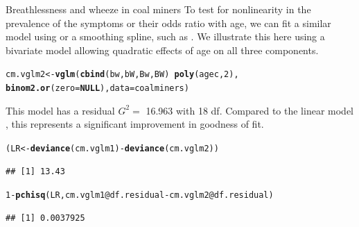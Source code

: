 \documentclass[11pt]{book}\usepackage[]{graphicx}\usepackage[]{color}
\makeatletter
\newcommand{\hlnum}[1]{\textcolor[rgb]{0.686,0.059,0.569}{#1}}%
\newcommand{\hlopt}[1]{\textcolor[rgb]{0,0,0}{#1}}%
\newcommand{\hlstd}[1]{\textcolor[rgb]{0.345,0.345,0.345}{#1}}%
\newcommand{\hlkwa}[1]{\textcolor[rgb]{0.161,0.373,0.58}{\textbf{#1}}}%
\newcommand{\hlkwb}[1]{\textcolor[rgb]{0.69,0.353,0.396}{#1}}%
\newcommand{\hlkwc}[1]{\textcolor[rgb]{0.333,0.667,0.333}{#1}}%
\newcommand{\hlkwd}[1]{\textcolor[rgb]{0.737,0.353,0.396}{\textbf{#1}}}%
\newenvironment{kframe}{%
 \def\at@end@of@kframe{}%
 \ifinner\ifhmode%
  \def\at@end@of@kframe{\end{minipage}}%
  \begin{minipage}{\columnwidth}%
 \fi\fi%
 \def\FrameCommand##1{\hskip\@totalleftmargin \hskip-\fboxsep
 \colorbox{shadecolor}{##1}\hskip-\fboxsep
     \hskip-\linewidth \hskip-\@totalleftmargin \hskip\columnwidth}%
 \MakeFramed {\advance\hsize-\width
   \@totalleftmargin\z@ \linewidth\hsize
   \@setminipage}}%
 {\par\unskip\endMakeFramed%
 \at@end@of@kframe}
\newenvironment{knitrout}{}{} %
\renewenvironment{knitrout}{\small\renewcommand{\baselinestretch}{.85}}{} %
\makeatother
\begin{document}
\begin{Example}[coalminers]{Breathlessness and wheeze in coal miners}
To test for nonlinearity in the prevalence of the symptoms or their odds ratio with
age, we can fit a similar model using  or a smoothing spline, such as
.  We illustrate this here using a bivariate model allowing quadratic
effects of age on all three components.

\begin{knitrout}
\color{fgcolor}\begin{kframe}
\begin{alltt}
\hlstd{cm.vglm2} \hlkwb{<-} \hlkwd{vglm}\hlstd{(}\hlkwd{cbind}\hlstd{(bw, bW, Bw, BW)} \hlopt{~} \hlkwd{poly}\hlstd{(agec,}\hlnum{2}\hlstd{),}
                 \hlkwd{binom2.or}\hlstd{(}\hlkwc{zero}\hlstd{=}\hlkwa{NULL}\hlstd{),} \hlkwc{data}\hlstd{=coalminers)}
\end{alltt}
\end{kframe}
\end{knitrout}

This model has a residual $G^2=$ 16.963 with 18
df.  Compared to the linear model , this represents a significant
improvement in goodness of fit.

\begin{knitrout}
\color{fgcolor}\begin{kframe}
\begin{alltt}
\hlstd{(LR} \hlkwb{<-} \hlkwd{deviance}\hlstd{(cm.vglm1)} \hlopt{-} \hlkwd{deviance}\hlstd{(cm.vglm2))}
\end{alltt}
\begin{verbatim}
## [1] 13.43
\end{verbatim}
\begin{alltt}
\hlnum{1} \hlopt{-} \hlkwd{pchisq}\hlstd{(LR, cm.vglm1}\hlopt{@}\hlkwc{df.residual} \hlopt{-} \hlstd{cm.vglm2}\hlopt{@}\hlkwc{df.residual}\hlstd{)}
\end{alltt}
\begin{verbatim}
## [1] 0.0037925
\end{verbatim}
\end{kframe}
\end{knitrout}


\end{Example}
\end{document}
